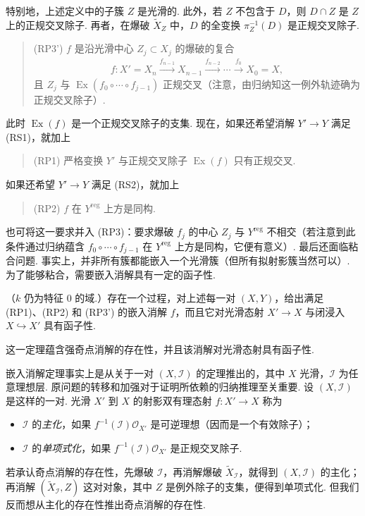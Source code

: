特别地，上述定义中的子簇 $Z$ 是光滑的. 此外，若 $Z$ 不包含于 $D$，则 $D\cap Z$ 是 $Z$ 上的正规交叉除子. 再者，在爆破 $\widetilde X_Z$ 中，$D$ 的全变换 $\pi_Z^{-1}(D)$ 是正规交叉除子.
\begin{quote}
\textup{(RP3')} $f$ 是沿光滑中心 $Z_j\subset X_j$ 的爆破的复合
\begin{align*}
f:X'=X_n\xrightarrow{f_{n-1}}X_{n-1}\xrightarrow{f_{n-2}}\cdots\xrightarrow{f_0}X_0=X,
\end{align*}
且 $Z_j$ 与 $\operatorname{Ex}(f_0\circ\cdots\circ f_{j-1})$ 正规交叉（注意，由归纳知这一例外轨迹确为正规交叉除子）.
\end{quote}
此时 $\operatorname{Ex}(f)$ 是一个正规交叉除子的支集. 现在，如果还希望消解 $Y'\longrightarrow Y$ 满足 (RS1)，就加上
\begin{quote}
\textup{(RP1)} 严格变换 $Y'$ 与正规交叉除子 $\operatorname{Ex}(f)$ 只有正规交叉.
\end{quote}
如果还希望 $Y'\longrightarrow Y$ 满足 (RS2)，就加上
\begin{quote}
\textup{(RP2)} $f$ 在 $Y^{\mathrm{reg}}$ 上方是同构.
\end{quote}
也可将这一要求并入 (RP3)：要求爆破 $f_j$ 的中心 $Z_j$ 与 $Y^{\mathrm{reg}}$ 不相交（若注意到此条件通过归纳蕴含 $f_0\circ\cdots\circ f_{j-1}$ 在 $Y^{\mathrm{reg}}$ 上方是同构，它便有意义）.
最后还面临粘合问题. 事实上，并非所有簇都能嵌入一个光滑簇（但所有拟射影簇当然可以）. 为了能够粘合，需要嵌入消解具有一定的函子性.
\begin{theorem}[Hironaka]\label{item:ag-4-1-11}
（$k$ 仍为特征 $0$ 的域.）存在一个过程，对上述每一对 $(X,Y)$，给出满足 (RP1)、(RP2) 和 (RP3') 的嵌入消解 $f$，而且它对光滑态射 $X'\longrightarrow X$ 与闭浸入 $X\hookrightarrow X'$ 具有函子性.
\end{theorem}
这一定理蕴含强奇点消解的存在性，并且该消解对光滑态射具有函子性.
\begin{numpara}\label{item:ag-4-1-12}
嵌入消解定理事实上是从关于一对 $(X,\mathcal I)$ 的定理推出的，其中 $X$ 光滑，$\mathcal I$ 为任意理想层. 原问题的转移和加强对于证明所依赖的归纳推理至关重要.
设 $(X,\mathcal I)$ 是这样的一对. 光滑 $X'$ 到 $X$ 的射影双有理态射 $f:X'\longrightarrow X$ 称为
\begin{itemize}
\item $\mathcal I$ 的\emph{主化}，如果 $f^{-1}(\mathcal I)\mathcal O_{X'}$ 是可逆理想（因而是一个有效除子）；
\item $\mathcal I$ 的\emph{单项式化}，如果 $f^{-1}(\mathcal I)\mathcal O_{X'}$ 是正规交叉除子.
\end{itemize}
若承认奇点消解的存在性，先爆破 $\mathcal I$，再消解爆破 $\widetilde X_{\mathcal I}$，就得到 $(X,\mathcal I)$ 的主化；再消解 $(\widetilde X_{\mathcal I},Z)$ 这对对象，其中 $Z$ 是例外除子的支集，便得到单项式化. 但我们反而想从主化的存在性推出奇点消解的存在性.
\end{numpara}
